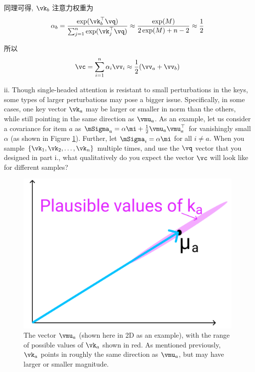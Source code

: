 \documentclass[openany]{ctexbook}
\theoremstyle{kaiti}
\theoremstyle{normal}
\begin{document}
同理可得, $\vk_b$ 注意力权重为
\begin{equation}
  \alpha_b
  =\frac{\exp(\vk_{b}^{\top}\vq)}{\sum_{j=1}^{n}\exp(\vk_{j}^{\top}\vq)}
  \approx\frac{\exp(M)}{2\exp(M)+n-2}
  \approx\frac{1}{2}
\end{equation}

所以
\begin{equation}
  \vc
  =\sum_{i=1}^{n}\alpha_{i}\vv_{i}
  \approx\frac{1}{2}(\vv_{a}+\vv_{b})
\end{equation}

\quad ii. Though single-headed attention is resistant to small perturbations in the keys, some types of larger perturbations may pose a bigger issue. Specifically, in some cases, one key vector $\vk_a$ may be larger or smaller in norm than the others, while still pointing in the same direction as $\vmu_a$. As an example, let us consider a covariance for item $a$ as $\mSigma_{a}=\alpha \mi+\frac{1}{2}\vmu_{a} \vmu_{a}^{\top}$ for vanishingly small $\alpha$ (as shown in Figure \ref{fig:1}). Further, let $\mSigma_{i}=\alpha\mi$ for all $i \neq a$. When you sample $\{\vk_{1},\vk_2,\dots, \vk_{n}\}$ multiple times, and use the $\vq$ vector that you designed in part i., what qualitatively do you expect the vector $\vc$ will look like for different samples?
\begin{figure}[t]
  \centering
  \includegraphics[scale=0.5]{figure1.png}
  \caption{The vector $\vmu_a$ (shown here in 2D as an example), with the range of possible values of $\vk_a$ shown in red. As mentioned previously, $\vk_a$ points in roughly the same direction as $\vmu_a$, but may have larger or smaller magnitude.}
  \label{fig:1}
\end{figure}
\end{document}
